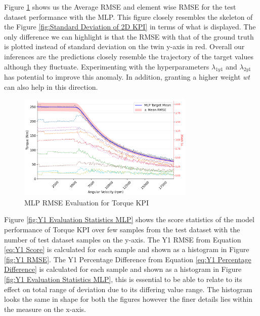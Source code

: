 \documentclass{report} %
\begin{document}
Figure \ref{fig:MLP RMSE Evaluation for 2D KPI(Torque)} shows us the Average \ac{RMSE} and element wise \ac{RMSE} for the test dataset performance with the \ac{MLP}. 
This figure closely resembles the skeleton of the Figure \ref{fig:Standard Deviation of 2D KPI} in terms of what is displayed. The only difference we can highlight is 
that the \ac{RMSE} with that of the ground truth is plotted instead of standard deviation on the twin y-axis in red.
Overall our inferences are the predictions closely resemble the trajectory of the target values although they fluctuate. Experimenting with the hyperparameters 
\textit{$\lambda_{1y1}$} and \textit{$\lambda_{2y1}$} has potential to improve this anomaly. In addition, granting a higher weight \textit{wt} can also help in this direction.

\begin{figure}[H]
    \centering
    \includegraphics[width=0.75\textwidth]{./ReportImages/RMSE_MLP_y1.png} 
    \caption{\ac{MLP} \ac{RMSE} Evaluation for Torque \ac{KPI}} 
    \label{fig:MLP RMSE Evaluation for 2D KPI(Torque)}
\end{figure}

Figure \ref{fig:Y1 Evaluation Statistics MLP} shows the score statistics of the model performance of Torque \ac{KPI} over few samples from the test dataset 
with the number of test dataset samples on the y-axis.
The Y1 \ac{RMSE} from Equation \ref{eq:Y1 Score} is calculated for each sample and shown as a histogram in Figure \ref{fig:Y1 RMSE}.
The Y1 Percentage Difference from Equation \ref{eq:Y1 Percentage Difference} is calculated for each sample and shown as a histogram in Figure 
\ref{fig:Y1 Evaluation Statistics MLP}, this is essential to be able to relate to its effect on total range of deviation due to its differing value range. 
The histogram looks the same in shape for both the figures however the finer details lies within the measure on the x-axis.
\end{document}
